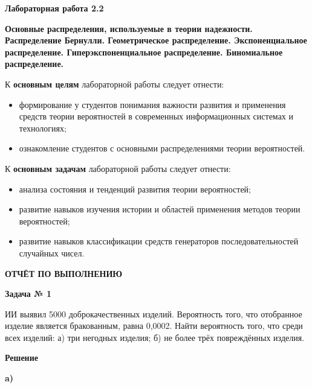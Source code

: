 
\graphicspath{ {2.2/models/} }
\usepackage{hyperref}
\usepackage{upgreek}

\pagestyle{fancy}
\fancyhead{}
\renewcommand{\headrulewidth}{0pt}


\begin{center}
    \textbf{Лабораторная работа 2.2}

    \textbf{Основные распределения, используемые в
теории надежности. Распределение Бернулли. Геометрическое
распределение. Экспоненциальное распределение.
Гиперэкспоненциальное распределение. Биномиальное распределение.}
\end{center}

К \textbf{основным целям} лабораторной работы следует отнести:

\begin{itemize}
    \item формирование у студентов понимания важности развития и применения средств теории вероятностей в современных информационных системах и технологиях;
    \item ознакомление студентов с основными распределениями теории вероятностей.
\end{itemize}

К \textbf{основным задачам} лабораторной работы следует отнести:

\begin{itemize}
    \item анализа состояния и тенденций развития теории вероятностей;
    \item развитие навыков изучения истории и областей применения методов теории вероятностей;
    \item развитие навыков классификации средств генераторов последовательностей случайных чисел.
\end{itemize}
\bigskip

\pagebreak

\begin{center}
\textbf{ОТЧЁТ ПО ВЫПОЛНЕНИЮ}
\end{center}

\textbf{Задача № 1}

ИИ выявил 5000 доброкачественных изделий. Вероятность того, что
отобранное изделие является бракованным, равна 0,0002. Найти
вероятность того, что среди всех изделий: а) три негодных изделия; б) не
более трёх повреждённых изделия.

\textbf{Решение}

\textbf{a)}

